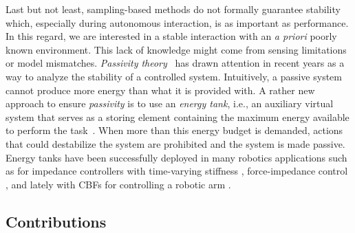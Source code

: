 Last but not least, sampling-based methods do not formally guarantee stability which, especially during autonomous interaction, is as important as performance. In this regard, we are interested in a stable interaction with an \emph{a priori} poorly known environment. This lack of knowledge might come from sensing limitations or model mismatches. \emph{Passivity theory}~\cite{willems1972dissipative} has drawn attention in recent years as a way to analyze the stability of a controlled system. Intuitively, a passive system cannot produce more energy than what it is provided with. A rather new approach to ensure \emph{passivity} is to use an \emph{energy tank}, i.e., an auxiliary virtual system that serves as a storing element containing the maximum energy available to perform the task~\cite{ferraguti2015energy}. When more than this energy budget is demanded, actions that could destabilize the system are prohibited and the system is made passive. Energy tanks have been successfully deployed in many robotics applications such as for impedance controllers with time-varying stiffness \cite{schindlbeck2015unified}, force-impedance control \cite{shahriari2018valve}, and lately with CBFs for controlling a robotic arm \cite{benzi2021optimization}.
 

\subsection{Contributions}
 


